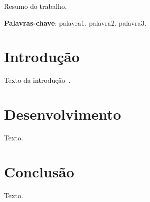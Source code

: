 \documentclass[12pt,oneside,a4paper,brazil]{abntex2}
\begin{document}
\pretextual
\imprimircapa
\imprimirfolhaderosto

\begin{resumo}
Resumo do trabalho.

\textbf{Palavras-chave}: palavra1. palavra2. palavra3.
\end{resumo}

\tableofcontents*

\textual

\chapter{Introdução}
Texto da introdução~\cite{knuth1984}.

\chapter{Desenvolvimento}
Texto.

\chapter{Conclusão}
Texto.

\postextual

\end{document}
